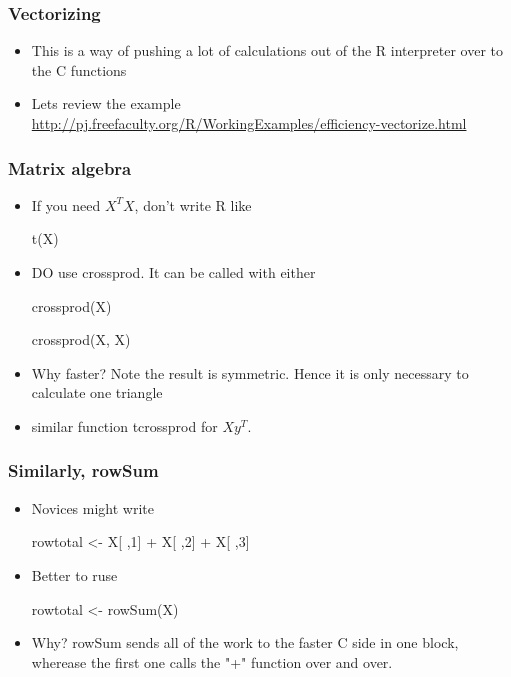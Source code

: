 \documentclass[10pt,english]{beamer}
\begin{document}
\begin{frame}
  \frametitle{Vectorizing}
  \begin{itemize}
  \item This is a way of pushing a lot of calculations out of the R
    interpreter over to the C functions
  \item Lets review the example \url{http://pj.freefaculty.org/R/WorkingExamples/efficiency-vectorize.html}
  \end{itemize}
\end{frame}
   
 

\begin{frame}
  \frametitle{Matrix algebra}
  \begin{itemize}
  \item If you need  $X^TX$, don't write R like
\begin{Sinput}
  t(X) %*% X
\end{Sinput}
  \item DO use crossprod. It can be called with either
\begin{Sinput}
  crossprod(X)
\end{Sinput}   
\begin{Sinput}
  crossprod(X, X)
\end{Sinput}   
  \item Why faster?  Note the result is symmetric.  Hence it is only
    necessary to calculate one triangle
  \item similar function tcrossprod for $X y^T$.
  \end{itemize}
\end{frame}
   

\begin{frame}
  \frametitle{Similarly, rowSum}
  \begin{itemize}
  \item Novices might write
\begin{Sinput}
  rowtotal <- X[ ,1] + X[ ,2] + X[ ,3] 
\end{Sinput}
  \item Better to ruse
\begin{Sinput}
  rowtotal <-  rowSum(X)
\end{Sinput}
  \item Why? rowSum sends all of the work to the faster C side in one
    block, wherease the first one calls the "+" function over and over.  
    
  \end{itemize}
\end{frame}
\end{document}
